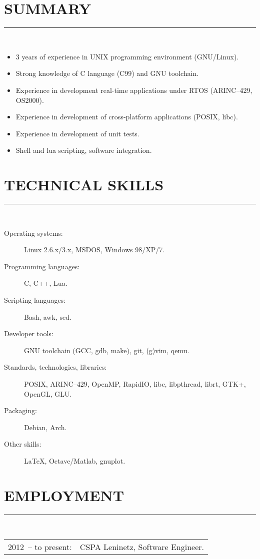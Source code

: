 \documentclass[a4paper,oneside,12pt]{article}
\newcommand{\cvpart}[1]{%
\vspace{-0.9em}%
\section*{\Large\bfseries\MakeTextUppercase{#1}}%
\vspace{-1.7em}%
\rule{\linewidth}{0.3em}\\[-0.8em]%
}
\begin{document}
\cvpart{Summary}
\begin{itemize}
\item 3 years of experience in UNIX programming environment (GNU/Linux).
\item Strong knowledge of C language (C99) and GNU toolchain.
\item Experience in development real-time applications under RTOS (ARINC--429, OS2000).
\item Experience in development of cross-platform applications (POSIX, libc).
\item Experience in development of unit tests.
\item Shell and lua scripting, software integration.
\end{itemize}


\cvpart{Technical skills}
\begin{description}
\item[Operating systems:] Linux 2.6.x/3.x, MSDOS, Windows 98/XP/7.
\item[Programming languages:] C, C++, Lua. 
\item[Scripting languages:] Bash, awk, sed.   
\item[Developer tools:] GNU toolchain (GCC, gdb, make), git, (g)vim, qemu.
\item[Standards, technologies, libraries:] POSIX, ARINC--429, OpenMP, RapidIO, libc, libpthread, librt, GTK+, OpenGL, GLU. 
\item[Packaging:] Debian, Arch.
\item[Other skills:]  LaTeX, Octave/Matlab, gnuplot.
\end{description}


\cvpart{Employment}

\begin{tabularx}{\linewidth}{lX}
2012~-- to present:& CSPA Leninetz, Software Engineer.\\
\end{tabularx}
\end{document}
